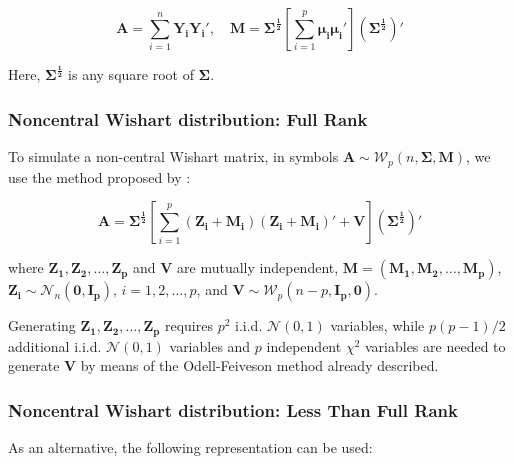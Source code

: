\begin{equation}
	\boldsymbol{A} = \sum_{i=1}^n \boldsymbol{Y_i Y_i'}, \quad \boldsymbol{M} = \boldsymbol{\Sigma^{\frac{1}{2}}} \left[ \sum_{i=1}^{p} \boldsymbol{\mu_i} \boldsymbol{\mu_i}' \right] \left(\boldsymbol{\Sigma^{\frac{1}{2}}}\right)' 
\end{equation}

Here,  $\boldsymbol{\Sigma^{\frac{1}{2}}}$ is any square root of $\boldsymbol{\Sigma}$.



\subsubsection{Noncentral Wishart distribution: Full Rank}

To simulate a  non-central Wishart matrix, in symbols $\boldsymbol{A}  \sim \mathcal{W}_p(n, \boldsymbol{\Sigma}, \boldsymbol{M})$, we use the method proposed by \cite{gleser1976}:

\begin{equation}
	\boldsymbol{A} = \boldsymbol{\Sigma^{\frac{1}{2}}} \left[ \sum_{i=1}^{p} (\boldsymbol{Z_i} + \boldsymbol{M_i}) (\boldsymbol{Z_i} + \boldsymbol{M_i})' + \boldsymbol{V} \right] \left(\boldsymbol{\Sigma^{\frac{1}{2}}}\right)' \label{eq:GleserStandard}
\end{equation}

where $\boldsymbol{Z_1}, \boldsymbol{Z_2}, \ldots, \boldsymbol{Z_p}$ and $\boldsymbol{V}$ are mutually independent, $\boldsymbol{M} = \left(\boldsymbol{M_1}, \boldsymbol{M_2}, \ldots, \boldsymbol{M_p}\right)$,  $\boldsymbol{Z_i}  \sim \mathcal{N}_n(\boldsymbol{0}, \boldsymbol{I_p})$, $i=1,2,\ldots,p$, and $\boldsymbol{V}  \sim \mathcal{W}_p(n-p, \boldsymbol{I_p}, \boldsymbol{0})$.

Generating $\boldsymbol{Z_1}, \boldsymbol{Z_2}, \ldots, \boldsymbol{Z_p}$ requires $p^2$ i.i.d.  $\mathcal{N}(0, 1)$ variables, while $p(p-1)/2$ additional i.i.d.  $\mathcal{N}(0, 1)$ variables and $p$ independent $\chi^2$ variables are needed to generate $\boldsymbol{V}$ by means of the Odell-Feiveson method already described.


\subsubsection{Noncentral Wishart distribution: Less Than Full Rank}
As an alternative, the following representation can be used: 

